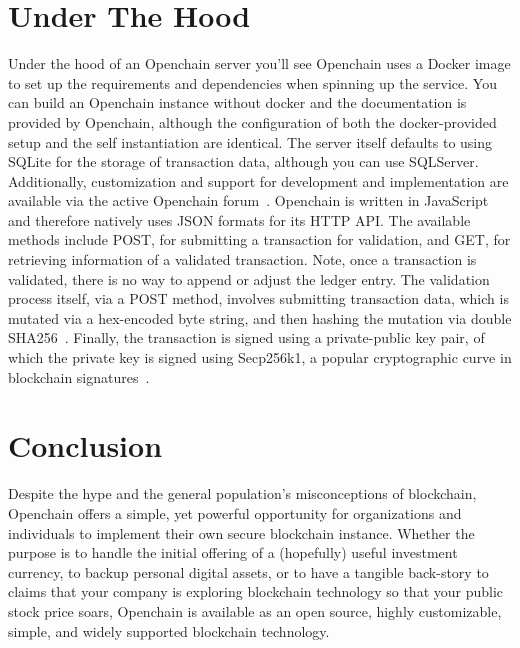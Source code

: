 \section{Under The Hood}
Under the hood of an Openchain server you'll see Openchain uses a Docker image to set up the requirements and dependencies when spinning up the service. You can build an Openchain instance without docker and the documentation is provided by Openchain, although the configuration of both the docker-provided setup and the self instantiation are identical. The server itself defaults to using SQLite for the storage of transaction data, although you can use SQLServer. Additionally, customization and support for development and implementation are available via the active Openchain forum~\cite{OpenchainForum}. Openchain is written in JavaScript and therefore natively uses JSON formats for its HTTP API. The available methods include POST, for submitting a transaction for validation, and GET, for retrieving information of a validated transaction. Note, once a transaction is validated, there is no way to append or adjust the ledger entry. The validation process itself, via a POST method, involves submitting transaction data, which is mutated via a hex-encoded byte string, and then hashing the mutation via double SHA256~\cite{SHA256Wiki}. Finally, the transaction is signed using a private-public key pair, of which the private key is signed using Secp256k1, a popular cryptographic curve in blockchain signatures~\cite{Secp256k1Wiki}.

\section{Conclusion}
Despite the hype and the general population's misconceptions of blockchain, Openchain offers a simple, yet powerful opportunity for organizations and individuals to implement their own secure blockchain instance. Whether the purpose is to handle the initial offering of a (hopefully) useful investment currency, to backup personal digital assets, or to have a tangible back-story to claims that your company is exploring blockchain technology so that your public stock price soars, Openchain is available as an open source, highly customizable, simple, and widely supported blockchain technology.


